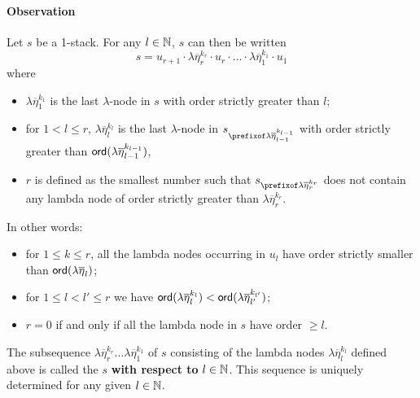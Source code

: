 \documentclass[a4paper,draft]{article}
\theoremstyle{remark}
\theoremstyle{definition}
\begin{document}
\paragraph{Observation}
Let $s$ be a 1-stack. For any $l\in \mathbb{N}$, $s$ can then be written
$$ s = u_{r+1} \cdot \lambda \overline{\eta}_r^{k_r} \cdot u_r \cdot
\ldots \cdot \lambda \overline{\eta}_1^{k_1} \cdot  u_1 $$
where
\begin{itemize}
\item  $\lambda \overline{\eta}_1^{k_1}$ is the
last $\lambda$-node in $s$ with order strictly greater than $l$;

\item for $1 < l \leq r$, $\lambda
\overline{\eta}_l^{k_l}$ is the last $\lambda$-node in $s_{\prefixof
\lambda \overline{\eta}_{l-1}^{k_{l-1}}}$ with order strictly
greater than ${\sf ord}(\lambda \overline{\eta}_{l-1}^{k_{l-1}})$,

\item  $r$ is defined as the smallest number such that
$s_{\prefixof \lambda \overline{\eta}_{r}^{k_{r}}}$ does not contain
any lambda node of order strictly greater than $\lambda
\overline{\eta}_{r}^{k_{r}}$.
\end{itemize}

\noindent In other words:
\begin{itemize}
\item for $1 \leq k \leq r$, all the lambda nodes occurring in $u_l$ have order
strictly smaller than ${\sf ord}(\lambda \overline{\eta}_l)$;
\item for $1\leq l<l'\leq r$ we have ${\sf ord}(\lambda \overline{\eta}_l^{k_l})
< {\sf ord}(\lambda \overline{\eta}_{l'}^{k_{l'}})$;
\item $r=0$ if and only if all the lambda node in $s$ have order $\geq l$.
\end{itemize}

The subsequence $\lambda \overline{\eta}_r^{k_r} \ldots \lambda\overline{\eta}_1^{k_1}$ of $s$ consisting of the lambda nodes $\lambda
\overline{\eta}_l^{k_l}$ defined above is called the  $s$ {\bf with respect to} $l\in\mathbb{N}$.
This sequence is uniquely determined for any given $l\in \mathbb{N}$.

\smallskip
\end{document}
